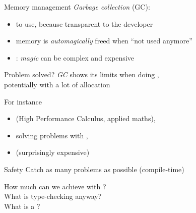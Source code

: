 \documentclass[10pt]{beamer}
\begin{document}
\begin{frame}{Memory management}
  \emph{Garbage collection} (GC):
  \begin{itemize}
    \item {} to use, because transparent to the developer
    \item memory is \emph{automagically} freed when ``not used anymore''
    \item<2-> : \emph{magic} can be complex and expensive
  \end{itemize}
  \bigskip{}
  \bigskip
\end{frame}




\begin{frame}{Problem solved?}
  \emph{GC} shows its limits when doing ,\\
  potentially with a lot of allocation
  \bigskip

  For instance
  \smallskip
  \begin{itemize}\bigsep
    \item {} \hfill (High Performance Calculus, applied maths),
    \item solving problems with ,
    \item {} \hfill (surprisingly expensive)
  \end{itemize}
\end{frame}






\begin{frame}{Safety}
  Catch as many problems as possible  (compile-time)
  \bigskip
  \begin{center}
    How much can we achieve with ?\\
    What is type-checking anyway?\\
    What is a ?
  \end{center}
\end{frame}
\end{document}
